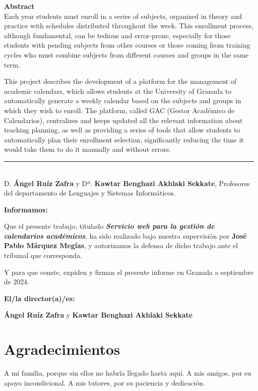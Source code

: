 \noindent\textbf{Abstract}\\

Each year students must enroll in a series of subjects, organized in theory and practice with schedules distributed throughout the week. This enrollment process, although fundamental, can be tedious and error-prone, especially for those students with pending subjects from other courses or those coming from training cycles who must combine subjects from different courses and groups in the same term.\newline

This project describes the development of a platform for the management of academic calendars, which allows students at the University of Granada to automatically generate a weekly calendar based on the subjects and groups in which they wish to enroll. The platform, called GAC (Gestor Académico de Calendarios), centralizes and keeps updated all the relevant information about teaching planning, as well as providing a series of tools that allow students to automatically plan their enrollment selection, significantly reducing the time it would take them to do it manually and without errors.

\cleardoublepage

\thispagestyle{empty}

\noindent\rule[-1ex]{\textwidth}{2pt}\\[4.5ex]

D. \textbf{Ángel Ruíz Zafra} y Dª. \textbf{Kawtar Benghazi Akhlaki Sekkate}, Profesores del departamento de Lenguajes y Sistemas Informáticos.
\vspace{0.5cm}

\textbf{Informamos:}

\vspace{0.5cm}

Que el presente trabajo, titulado \textit{\textbf{Servicio web para la gestión de calendarios académicos}},
ha sido realizado bajo nuestra supervisión por \textbf{José Pablo Márquez Megías}, y autorizamos la defensa de dicho trabajo ante el tribunal
que corresponda.

\vspace{0.5cm}

Y para que conste, expiden y firman el presente informe en Granada a septiembre de 2024.

\vspace{1cm}

\textbf{El/la director(a)/es: }

\vspace{5cm}

\noindent \textbf{Ángel Ruíz Zafra} y \textbf{Kawtar Benghazi Akhlaki Sekkate}

\chapter*{Agradecimientos}

A mi familia, porque sin ellos no habría llegado hasta aquí. A mis amigos, por su apoyo incondicional. A mis tutores, por su paciencia y dedicación.
